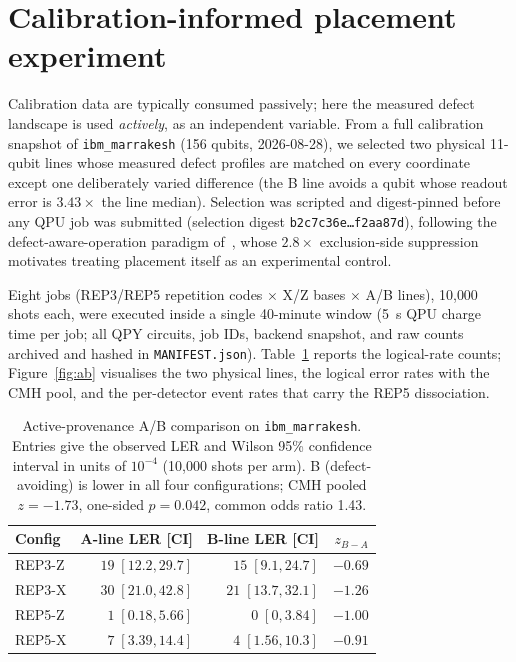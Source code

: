 \documentclass[pdflatex,sn-mathphys-num]{sn-jnl}
\theoremstyle{thmstyleone}
\theoremstyle{thmstyletwo}
\theoremstyle{thmstylethree}
\begin{document}
\section{Calibration-informed placement experiment}
\label{app:activeprov}

Calibration data are typically consumed passively; here the measured defect landscape is used \emph{actively}, as an independent variable. From a full calibration snapshot of \texttt{ibm\_marrakesh} (156 qubits, 2026-08-28), we selected two physical 11-qubit lines whose measured defect profiles are matched on every coordinate except one deliberately varied difference (the B line avoids a qubit whose readout error is $3.43\times$ the line median). Selection was scripted and digest-pinned before any QPU job was submitted (selection digest \texttt{b2c7c36e\ldots f2aa87d}), following the defect-aware-operation paradigm of~\cite{Bartlett2026defect}, whose $2.8\times$ exclusion-side suppression motivates treating placement itself as an experimental control.

Eight jobs (REP3/REP5 repetition codes $\times$ X/Z bases $\times$ A/B lines), 10{,}000 shots each, were executed inside a single 40-minute window (5~s QPU charge time per job; all QPY circuits, job IDs, backend snapshot, and raw counts archived and hashed in \texttt{MANIFEST.json}). Table~\ref{tab:ab} reports the logical-rate counts; Figure~\ref{fig:ab} visualises the two physical lines, the logical error rates with the CMH pool, and the per-detector event rates that carry the REP5 dissociation.

\begin{table}[htbp]\centering\small
\caption{Active-provenance A/B comparison on \texttt{ibm\_marrakesh}. Entries give the observed LER and Wilson 95\% confidence interval in units of $10^{-4}$ (10{,}000 shots per arm). B (defect-avoiding) is lower in all four configurations; CMH pooled $z=-1.73$, one-sided $p=0.042$, common odds ratio 1.43.}
\label{tab:ab}
\begin{tabular}{@{}lrrr@{}}
\toprule
Config & A-line LER [CI] & B-line LER [CI] & $z_{B-A}$ \\\midrule
REP3-Z & $19\;[12.2,29.7]$ & $15\;[9.1,24.7]$ & $-0.69$ \\
REP3-X & $30\;[21.0,42.8]$ & $21\;[13.7,32.1]$ & $-1.26$ \\
REP5-Z & $1\;[0.18,5.66]$ & $0\;[0,3.84]$ & $-1.00$ \\
REP5-X & $7\;[3.39,14.4]$ & $4\;[1.56,10.3]$ & $-0.91$ \\
\bottomrule
\end{tabular}
\end{table}
\end{document}

